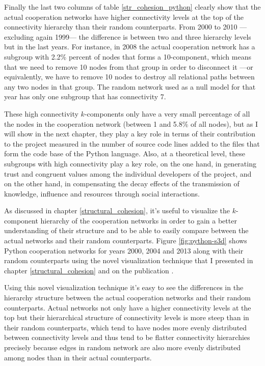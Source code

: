 Finally the last two columns of table \ref{str_cohesion_python} clearly show that the actual cooperation networks have higher connectivity levels at the top of the connectivity hierarchy than their random counterparts. From 2000 to 2010 ---excluding again 1999--- the difference is between two and three hierarchy levels but in the last years. For instance, in 2008 the actual cooperation network has a subgroup with 2.2\% percent of nodes that forms a 10-component, which means that we need to remove 10 nodes from that group in order to disconnect it ---or equivalently, we have to remove 10 nodes to destroy all relational paths between any two nodes in that group. The random network used as a null model for that year has only one subgroup that has connectivity 7.

These high connectivity $k$-components only have a very small percentage of all the nodes in the cooperation network (between 1 and 5.8\% of all nodes), but as I will show in the next chapter, they play a key role in terms of their contribution to the project measured in the number of source code lines added to the files that form the code base of the Python language. Also, at a theoretical level, these subgroups with high connectivity play a key role, on the one hand, in generating trust and congruent values among the individual developers of the project, and on the other hand, in compensating the decay effects of the transmission of knowledge, influence and resources through social interactions.

As discussed in chapter \ref{structural_cohesion}, it's useful to visualize the $k$-component hierarchy of the cooperation networks in order to gain a better understanding of their structure and to be able to easily compare between the actual networks and their random counterparts. Figure \ref{fig:python-s3d} shows Python cooperation networks for years 2000, 2004 and 2013 along with their random counterparts using the novel visualization technique that I presented in chapter \ref{structural_cohesion} and on the publication \citep{torrents:2015}.

Using this novel visualization technique it's easy to see the differences in the hierarchy structure between the actual cooperation networks and their random counterparts. Actual networks not only have a higher connectivity levels at the top but their hierarchical structure of connectivity levels is more steep than in their random counterparts, which tend to have nodes more evenly distributed between connectivity levels and thus tend to be flatter connectivity hierarchies precisely because edges in random network are also more evenly distributed among nodes than in their actual counterparts.

